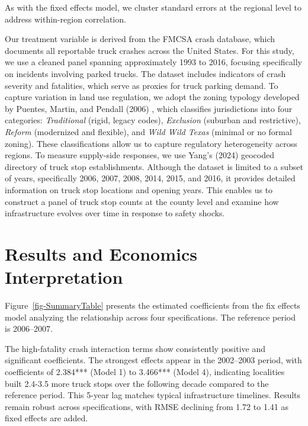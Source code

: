 \documentclass[
  12pt]{article}
\begin{document}
As with the fixed effects model, we cluster standard errors at the
regional level to address within-region correlation.

Our treatment variable is derived from the FMCSA crash database, which
documents all reportable truck crashes across the United States. For
this study, we use a cleaned panel spanning approximately 1993 to 2016,
focusing specifically on incidents involving parked trucks. The dataset
includes indicators of crash severity and fatalities, which serve as
proxies for truck parking demand. To capture variation in land use
regulation, we adopt the zoning typology developed by Puentes, Martin,
and Pendall (2006) \citep{puentesTraditionalReformedReview2006}, which
classifies jurisdictions into four categories: \emph{Traditional}
(rigid, legacy codes), \emph{Exclusion} (suburban and restrictive),
\emph{Reform} (modernized and flexible), and \emph{Wild Wild Texas}
(minimal or no formal zoning). These classifications allow us to capture
regulatory heterogeneity across regions. To measure supply-side
responses, we use Yang's (2024) geocoded directory of truck stop
establishments. Although the dataset is limited to a subset of years,
specifically 2006, 2007, 2008, 2014, 2015, and 2016, it provides
detailed information on truck stop locations and opening years. This
enables us to construct a panel of truck stop counts at the county level
and examine how infrastructure evolves over time in response to safety
shocks.

\section{Results and Economics
Interpretation}\label{results-and-economics-interpretation}

Figure~\ref{fig-SummaryTable} presents the estimated coefficients from
the fix effects model analyzing the relationship across four
specifications. The reference period is 2006--2007.

The high-fatality crash interaction terms show consistently positive and
significant coefficients. The strongest effects appear in the 2002--2003
period, with coefficients of 2.384*** (Model 1) to 3.466*** (Model 4),
indicating localities built 2.4-3.5 more truck stops over the following
decade compared to the reference period. This 5-year lag matches typical
infrastructure timelines. Results remain robust across specifications,
with RMSE declining from 1.72 to 1.41 as fixed effects are added.
\end{document}
